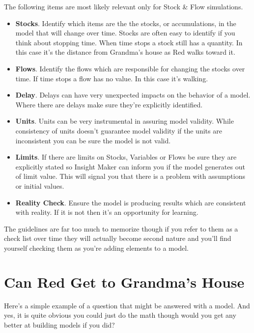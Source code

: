 \documentclass[]{memoir}
\begin{document}
The following items are most likely relevant only for Stock \& Flow
simulations.

\begin{itemize}
\itemsep1pt\parskip0pt
\item
  \textbf{Stocks}. Identify which items are the the stocks, or
  accumulations, in the model that will change over time. Stocks are
  often easy to identify if you think about stopping time. When time
  stops a stock still has a quantity. In this case it's the distance
  from Grandma's house as Red walks toward it.
\item
  \textbf{Flows}. Identify the flows which are responsible for changing
  the stocks over time. If time stops a flow has no value. In this case
  it's walking.
\item
  \textbf{Delay}. Delays can have very unexpected impacts on the
  behavior of a model. Where there are delays make sure they're
  explicitly identified.
\item
  \textbf{Units}. Units can be very instrumental in assuring model
  validity. While consistency of units doesn't guarantee model validity
  if the units are inconsistent you can be sure the model is not valid.
\item
  \textbf{Limits}. If there are limits on Stocks, Variables or Flows be
  sure they are explicitly stated so Insight Maker can inform you if the
  model generates out of limit value. This will signal you that there is
  a problem with assumptions or initial values.
\item
  \textbf{Reality Check}. Ensure the model is producing results which
  are consistent with reality. If it is not then it's an opportunity for
  learning.
\end{itemize}

The guidelines are far too much to memorize though if you refer to them
as a check list over time they will actually become second nature and
you'll find yourself checking them as you're adding elements to a model.

\section{Can Red Get to Grandma's House}

Here's a simple example of a question that might be answered with a
model. And yes, it is quite obvious you could just do the math though
would you get any better at building models if you did?

\FloatBarrier 
\end{document}
